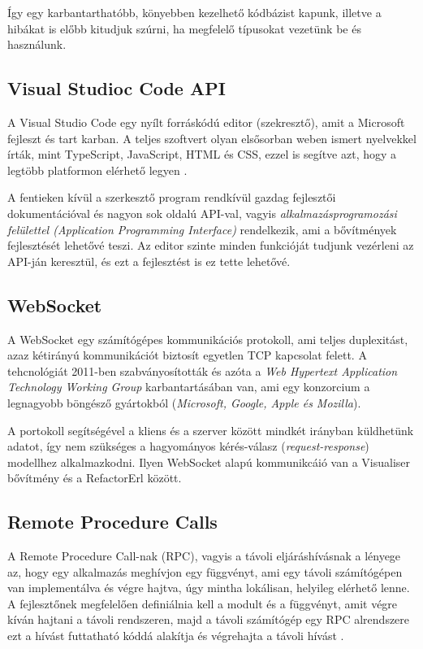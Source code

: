 Így egy karbantarthatóbb, könyebben kezelhető kódbázist kapunk, illetve a hibákat is előbb kitudjuk szúrni, ha megfelelő típusokat vezetünk be és használunk.

\subsection{Visual Studioc Code API}
A Visual Studio Code egy nyílt forráskódú editor (szekresztő), amit a Microsoft fejleszt és tart karban. A teljes szoftvert olyan elsősorban weben ismert nyelvekkel írták, mint TypeScript, JavaScript, HTML és CSS, ezzel is segítve azt, hogy a legtöbb platformon elérhető legyen \cite{wikipediaVSCODE}.

A fentieken kívül a szerkesztő program rendkívül gazdag fejlesztői dokumentációval és nagyon sok oldalú API-val, vagyis \textit{alkalmazásprogramozási felülettel (Application Programming Interface)} rendelkezik, ami a bővítmények fejlesztését lehetővé teszi. Az editor szinte minden funkcióját tudjunk vezérleni az API-ján keresztül, és ezt a fejlesztést is ez tette lehetővé.

\subsection{WebSocket}
A WebSocket egy számítógépes kommunikációs protokoll, ami teljes duplexitást, azaz kétirányú kommunikációt biztosít egyetlen TCP kapcsolat felett. A tehcnológiát 2011-ben szabványosították és azóta a \textit{Web Hypertext Application Technology Working Group} karbantartásában van, ami egy konzorcium a legnagyobb böngésző gyártokból (\textit{Microsoft, Google, Apple és Mozilla}). \cite{websocketWikipedia}

A portokoll segítségével a kliens és a szerver között mindkét irányban küldhetünk adatot, így nem szükséges a hagyományos kérés-válasz (\textit{request-response}) modellhez alkalmazkodni. Ilyen WebSocket alapú kommunikcáió van a Visualiser bővítmény és a RefactorErl között. 

\subsection{Remote Procedure Calls}
A Remote Procedure Call-nak (RPC), vagyis a távoli eljáráshívásnak a lényege az, hogy egy alkalmazás  meghívjon egy függvényt, ami egy távoli számítógépen van implementálva és végre hajtva, úgy mintha lokálisan, helyileg elérhető lenne. A fejlesztőnek megfelelően definiálnia kell a modult és a függvényt, amit végre kíván hajtani a távoli rendszeren, majd a távoli számítógép egy RPC alrendszere ezt a hívást futtatható kóddá alakítja és végrehajta a távoli hívást \cite{distributedSystems}.

